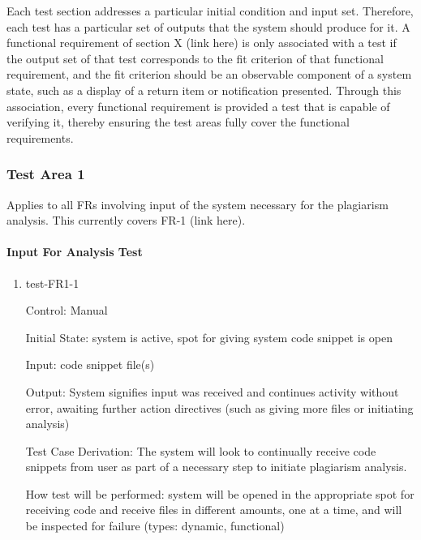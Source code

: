 \documentclass[12pt, titlepage]{article}
\begin{document}
Each test section addresses a particular initial condition and input set. 
Therefore, each test has a particular set of outputs that the system should 
produce for it. A functional requirement of section X (link here) is only 
associated with a test if the output set of that test corresponds to the fit 
criterion of that functional requirement, and the fit criterion should be an 
observable component of a system state, such as a display of a return item or 
notification presented. Through this association, every functional requirement 
is provided a test that is capable of verifying it, thereby ensuring the test 
areas fully cover the functional requirements.

\subsubsection{Test Area 1}

Applies to all FRs involving input of the system necessary for the plagiarism 
analysis. This currently covers FR-1 (link here).

\paragraph{Input For Analysis Test}

\begin{enumerate}

\item{test-FR1-1\\}

Control: Manual
					
Initial State: system is active, spot for giving system code snippet is open
					
Input: code snippet file(s)
					
Output: System signifies input was received and continues activity without 
error, awaiting further action directives (such as giving more files or 
initiating analysis)

Test Case Derivation: The system will look to continually receive code 
snippets from user as part of a necessary step to initiate plagiarism analysis.
					
How test will be performed: system will be opened in the appropriate spot for 
receiving code and receive files in different amounts, one at a time, 
and will be inspected for failure (types: dynamic, functional)
					

\end{enumerate}
\end{document}
